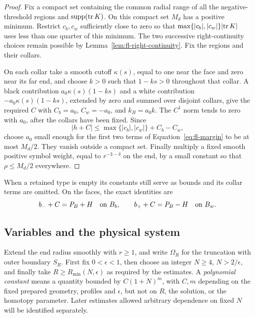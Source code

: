 \begin{proof}
Fix a compact set containing the common radial range of all the
negative-threshold regions and \(\operatorname{supp}(\operatorname{tr} K)\).
On this compact set \(M_d\) has a positive minimum.  Restrict
\(c_b,c_w\) sufficiently close to zero so that
\(\max\{\lvert c_b\rvert,\lvert c_w\rvert\}\lvert\operatorname{tr} K\rvert\)
uses less than one quarter of this minimum.  The two successive
right-continuity choices remain possible by
Lemma~\ref{lem:fl-right-continuity}.
Fix the regions and their collars.

On each collar take a smooth cutoff \(\kappa(s)\), equal to one near
the face and zero near its far end, and choose \(k>0\) such that
\(1-ks>0\) throughout that collar.  A black contribution
\(a_0\kappa(s)(1-ks)\) and a white contribution
\(-a_0\kappa(s)(1-ks)\), extended by zero and summed over disjoint
collars, give the required \(C\) with \(C_b=a_0\), \(C_w=-a_0\),
and \(k_B=a_0k\).  The \(C^1\) norm tends to zero with \(a_0\), after
the collars have been fixed.  Since
\[
 \lvert h+C\rvert
 \le\max\{\lvert c_b\rvert,\lvert c_w\rvert\}+C_b-C_w ,
\]
choose \(a_0\) small enough for the first two terms of
Equation~\eqref{eq:fl-margin} to be at most \(M_d/2\).
They vanish outside a compact set.  Finally multiply a fixed smooth
positive symbol weight, equal to \(r^{-3-\delta}\) on the end, by a
small constant so that \(\rho\le M_d/2\) everywhere.
\end{proof}

When a retained type is empty its constants still serve as bounds and
its collar terms are omitted.  On the faces, the exact identities are
\begin{equation}
\label{eq:fl-compatible-values}
 b_-+C=P_B+H\quad\hbox{on }B_b,\qquad
 b_++C=P_B-H\quad\hbox{on }B_w .
\end{equation}

\subsection{Variables and the physical system}
\label{subsec:fl-equations}

Extend the end radius smoothly with \(r\ge1\), and write \(\Omega_R\)
for the truncation with outer boundary \(S_R\).
First fix \(0<\epsilon<1\), then choose an integer
\(N\ge4\), \(N>2/\epsilon\), and finally take
\(R\ge R_{\min}(N,\epsilon)\) as required by the estimates.
A \emph{polynomial constant} means a quantity bounded by
\(C(1+N)^m\), with \(C,m\) depending on the fixed prepared geometry,
profiles and \(\epsilon\), but not on \(R\), the solution, or the
homotopy parameter.  Later estimates allowed arbitrary dependence on
fixed \(N\) will be identified separately.

